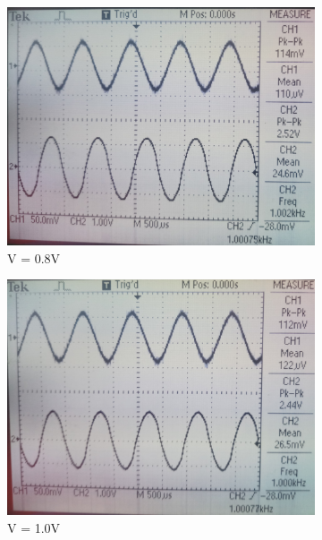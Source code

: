 \documentclass[12pt]{article}
\begin{document}
\begin{figure}[H]
\begin{subfigure}[b]{0.45\linewidth}
		\includegraphics[width = \linewidth, trim = {0 0 0 0}, clip]{PartD_5.jpg}
		\caption{V = 0.8V}
	\end{subfigure}
	\begin{subfigure}[b]{0.45\linewidth}
		\centering
		\includegraphics[width = \linewidth, trim = {0 0 0 0}, clip]{PartD_6.jpg}
		\caption{V = 1.0V}
	\end{subfigure}
	\begin{subfigure}[b]{0.45\linewidth}
		\centering

\end{subfigure}
\end{figure}
\end{document}
